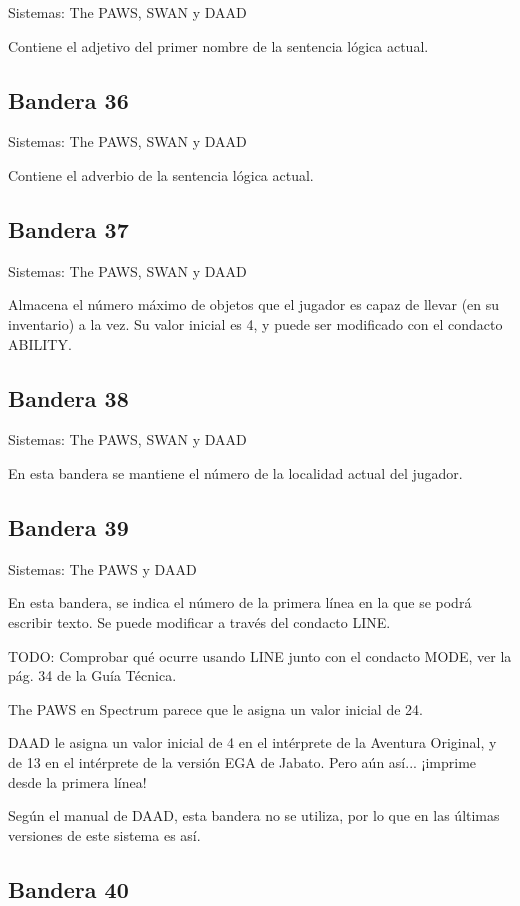 \documentclass[11pt, a5paper]{article}
\newcommand{\paw}{\textsf{The PAWS}\xspace}
\newcommand{\swan}{\textsf{SWAN}\xspace}
\newcommand{\daad}{\textsf{DAAD}\xspace}
\newcommand{\sistemas}[1]{\noindent Sistemas: #1 \nopagebreak}
\begin{document}
\sistemas{\paw, \swan y \daad}

Contiene el adjetivo del primer nombre de la sentencia lógica actual.

\subsection{Bandera 36}

\sistemas{\paw, \swan y \daad}

Contiene el adverbio de la sentencia lógica actual.

\subsection{Bandera 37}

\sistemas{\paw, \swan y \daad}

Almacena el número máximo de objetos que el jugador es capaz de llevar (en su inventario) a la vez. Su valor inicial es 4, y puede ser modificado con el condacto ABILITY.

\subsection{Bandera 38}

\sistemas{\paw, \swan y \daad}

En esta bandera se mantiene el número de la localidad actual del jugador.

\subsection{Bandera 39}

\sistemas{\paw y \daad}

En esta bandera, se indica el número de la primera línea en la que se podrá escribir texto. Se puede modificar a través del condacto LINE.

TODO: Comprobar qué ocurre usando LINE junto con el condacto MODE, ver la pág. 34 de la Guía Técnica.

\paw en Spectrum parece que le asigna un valor inicial de 24.

\daad le asigna un valor inicial de 4 en el intérprete de la Aventura Original, y de 13 en el intérprete de la versión EGA de Jabato. Pero aún así... ¡imprime desde la primera línea!

Según el manual de \daad, esta bandera no se utiliza, por lo que en las últimas versiones de este sistema es así.

\subsection{Bandera 40}
\end{document}
